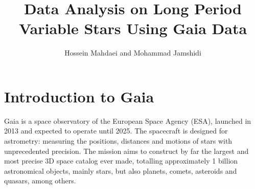 \documentclass[12pt,a4paper]{article}
\title{Data Analysis on Long Period Variable Stars Using Gaia Data}
\author{Hossein Mahdaei and Mohammad Jamshidi}
\date{}
\begin{document}
	\maketitle
	\section*{Introduction to Gaia}
	Gaia is a space observatory of the European Space Agency (ESA), launched in 2013 and expected to operate until 2025. The spacecraft is designed for astrometry: measuring the positions, distances and motions of stars with unprecedented precision. The mission aims to construct by far the largest and most precise 3D space catalog ever made, totalling approximately 1 billion astronomical objects, mainly stars, but also planets, comets, asteroids and quasars, among others.
	
\end{document}
